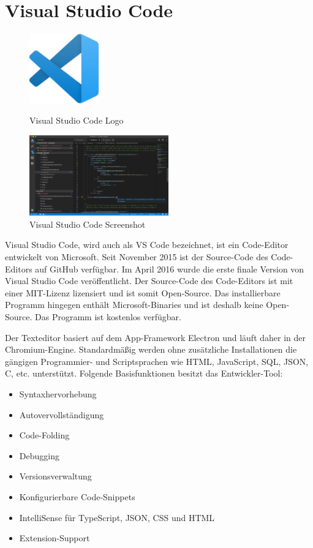\section{Visual Studio Code}
\begin{figure}[htb]
    \begin{center}
        \includegraphics[width=3cm] {./pics/Visual_Studio_Code_1.35_icon.svg.png}
        \caption{Visual Studio Code Logo \cite{VsCodeLogo}}
        \includegraphics[width=6cm]{./pics/VS_Code_1.36.0-insider.png}
        \caption{Visual Studio Code Screenshot \cite{VSCodeScreenshotPic}}
    \end{center}
\end{figure}

\cite{VsCodeDoc}
\cite{VsCodeWiki}
\cite{VsCodeWU}

Visual Studio Code, wird auch als VS Code bezeichnet, ist ein Code-Editor entwickelt von Microsoft. 
Seit November 2015 ist der Source-Code des Code-Editors auf GitHub verfügbar. Im April 2016 wurde die erste finale Version 
von Visual Studio Code veröffentlicht. Der Source-Code des Code-Editors ist mit einer MIT-Lizenz lizensiert und ist somit Open-Source.
Das installierbare Programm hingegen enthält Microsoft-Binaries und ist deshalb keine Open-Source. Das Programm ist kostenlos verfügbar.

Der Texteditor basiert auf dem App-Framework Electron und läuft daher in der Chromium-Engine. Standardmäßig werden ohne zusätzliche Installationen
die gängigen Programmier- und Scriptsprachen wie HTML, JavaScript, SQL, JSON, C, etc. unterstützt. 
Folgende Basisfunktionen besitzt das Entwickler-Tool:

\begin{itemize}
    \item Syntaxhervorhebung
    \item Autovervollständigung
    \item Code-Folding %
    \item Debugging
    \item Versionsverwaltung
    \item Konfigurierbare Code-Snippets
    \item IntelliSense für TypeScript, JSON, CSS und HTML
    \item Extension-Support
\end{itemize}

